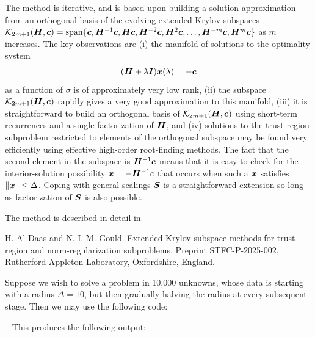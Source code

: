 \documentclass{galahad}
\newcommand{\package}{trek}
\begin{document}
\noindent
The method is iterative, and is based upon building a solution approximation
from an orthogonal basis of the evolving extended Krylov subspaces
${\cal K}_{2m+1}(\bmH,\bmc) = \mbox{span}\{\bmc,\bmH^{-1}\bmc,\bmH \bmc,
 \bmH^{-2}\bmc, \bmH^2\bmc,\ldots,\bmH^{-m}\bmc,\bmH^{m}\bmc\}$
as $m$ increases. The key observations are (i) the manifold of
solutions to the optimality system
\[ ( {\bm{H}} + \lambda {\bm{I}} ) {\bm{x}}(\lambda) = - {\bm{c}}\]
as a function of $\sigma$ is of approximately very low rank, (ii)
the subspace ${\cal K}_{2m+1}(\bmH,\bmc)$ rapidly gives a very good 
approximation to this manifold, (iii) it is straightforward to
build an orthogonal basis of ${\cal K}_{2m+1}(\bmH,\bmc)$
using short-term recurrences and a single factorization of ${\bm{H}}$, and
(iv) solutions to the trust-region subproblem restricted to elements
of the orthogonal subspace may be found very efficiently 
using effective high-order root-finding methods. The fact that the
second element in the subspace is ${\bm{H}}^{-1} {\bm{c}}$ means that it is easy
to check for the interior-solution possibility ${\bm{x}} = - {\bm{H}}^{-1} c$
that occurs when such a ${\bm{x}}$ satisfies $\|{\bm{x}}\| \leq \Delta$.
Coping with general scalings ${\bm{S}}$ is a straightforward extension so long
as factorization of ${\bm{S}}$ is also possible.

\galreference
The method is described in detail in
\vspace*{1mm}

\noindent
H. Al Daas and N. I. M. Gould.
Extended-Krylov-subspace methods for trust-region and norm-regularization 
subproblems. Preprint STFC-P-2025-002, Rutherford Appleton Laboratory,
Oxfordshire, England.


\galexample
Suppose we wish to solve a problem in 10,000 unknowns, whose data is
starting with a radius $\Delta = 10$, but then gradually halving the radius
at every subsequent stage. Then we may use the following code:

{\tt \small
\VerbatimInput{\packageexample}
}
\noindent
This produces the following output:
{\tt \small
\VerbatimInput{\packageresults}
}
\end{document}
